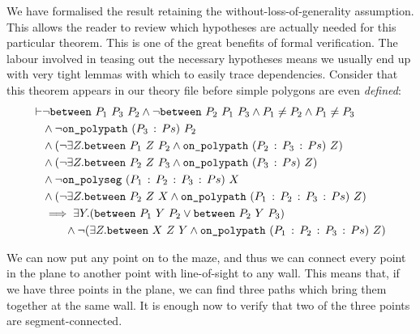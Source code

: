 We have formalised the result retaining the without-loss-of-generality assumption. This allows the reader to review which hypotheses are actually needed for this particular theorem. This is one of the great benefits of formal verification. The labour involved in teasing out the necessary hypotheses means we usually end up with very tight lemmas with which to easily trace dependencies. Consider that this theorem appears in our theory file before simple polygons are even \emph{defined}:
\begin{equation}\label{eq:RotateToWall}
  \begin{split}
\vdash&\neg\texttt{between}\ P_1\ P_3\ P_2 \wedge \neg\texttt{between}\ P_2\ P_1\ P_3 \wedge P_1 \neq P_2 \wedge P_1 \neq P_3\\
    &\wedge\neg\texttt{on\_polypath}\ (P_3\,:\,Ps)\ P_2\\
    &\wedge(\neg\exists Z. \texttt{between}\ P_1\ Z\ P_2 \wedge \texttt{on\_polypath}\ (P_2\,:\,P_3\,:\,Ps)\ Z)\\
    &\wedge(\neg\exists Z. \texttt{between}\ P_2\ Z\ P_3 \wedge \texttt{on\_polypath}\ (P_3\,:\,Ps)\ Z)\\
    &\wedge\neg\texttt{on\_polyseg}\ (P_1\,:\,P_2\,:\,P_3\,:\,Ps)\ X\\
    &\wedge(\neg\exists Z. \texttt{between}\ P_2\ Z\ X \wedge \texttt{on\_polypath}\ (P_1\,:\,P_2\,:\,P_3\,:\,Ps)\ Z)\\
    &\implies\exists Y. (\texttt{between}\ P_1\ Y\ P_2 \vee \texttt{between}\ P_2\ Y\ P_3)\\
    &\qquad \wedge \neg(\exists Z. \texttt{between}\ X\ Z\ Y \wedge \texttt{on\_polypath}\ (P_1\,:\,P_2\,:\,P_3\,:\,Ps)\ Z)
  \end{split}
\end{equation}

We can now put any point on to the maze, and thus we can connect every point in the plane to another point with line-of-sight to any wall. This means that, if we have three points in the plane, we can find three paths which bring them together at the same wall. It is enough now to verify that two of the three points are segment-connected.

